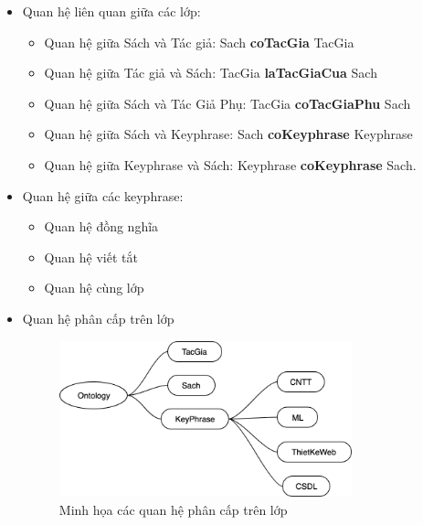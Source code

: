 \begin{itemize}
    \item Quan hệ liên quan giữa các lớp:
    \begin{itemize}
        \item Quan hệ giữa Sách và Tác giả: Sach \textbf{coTacGia} TacGia
        \item Quan hệ giữa Tác giả và Sách: TacGia \textbf{laTacGiaCua} Sach
        \item Quan hệ giữa Sách và Tác Giả Phụ: TacGia \textbf{coTacGiaPhu} Sach
        \item Quan hệ giữa Sách và Keyphrase: Sach \textbf{coKeyphrase} Keyphrase
        \item Quan hệ giữa Keyphrase và Sách: Keyphrase \textbf{coKeyphrase} Sach. 
    \end{itemize}
    
    \item Quan hệ giữa các keyphrase:
    \begin{itemize}
        \item Quan hệ đồng nghĩa
        \item Quan hệ viết tắt
        \item Quan hệ cùng lớp  
    \end{itemize}
    
    \item Quan hệ phân cấp trên lớp
    
    \begin{figure}[H]
        \centering
        \includegraphics[width=0.8\textwidth]{img/cay_phan_cap.png}
        \caption{Minh họa các quan hệ phân cấp trên lớp}
        \label{fig:quan_he_phan_cap}
    \end{figure}
    
    
    
\end{itemize}



